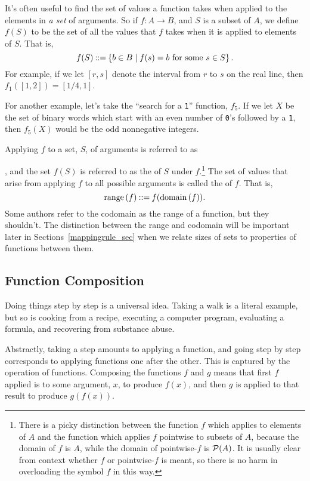 It's often useful to find the set of values a function takes when applied
to the elements in \emph{a set} of arguments.  So if $f:A \to B$, and $S$
is a subset of $A$, we define $f(S)$ to be the set of all the values that
$f$ takes when it is applied to elements of $S$.  That is,
\[
f(S) \mathbin{::=} \left\{b \in B \mid f(s) = b \text{ for some } s
  \in S\right\}.
\]
For example, if we let $[r,s]$ denote the interval from $r$ to $s$ on the
real line, then $f_1([1,2]) = [1/4,1]$.

For another example, let's take the ``search for a \texttt{1}''
function, $f_5$.  If we let $X$ be the set of binary words which
start with an even number of \texttt{0}'s followed by a
\texttt{1}, then $f_5(X)$ would be the odd nonnegative integers.

Applying $f$ to a set, $S$, of arguments is referred to as
, and the
set $f(S)$ is referred to as the  of $S$ under
$f$.\footnote{There is a picky distinction between the function $f$ which
  applies to elements of $A$ and the function which applies $f$ pointwise
  to subsets of $A$, because the domain of $f$ is $A$, while the domain of
  pointwise-$f$ is $\mathcal{P}(A)$.  It is usually clear from context whether
  $f$ or pointwise-$f$ is meant, so there is no harm in overloading the
  symbol $f$ in this way.}  The set of values that arise from applying $f$
to all possible arguments is called the  of $f$.  That is,
\[
\mathop{\textup{range}}\nolimits\left(f\right) \mathbin{::=} f(\mathop{\textup{domain}}\nolimits\left(f\right)).
\]
Some authors refer to the codomain as the range of a function, but
they shouldn't.  The distinction between the range and codomain will
be important later in Sections~\ref{mappingrule_sec} when we
relate sizes of sets to properties of functions between them.

\subsection{Function Composition}\label{func_compose_subsec}

Doing things step by step is a universal idea.  Taking a walk is a literal
example, but so is cooking from a recipe, executing a computer program,
evaluating a formula, and recovering from substance abuse.

Abstractly, taking a step amounts to applying a function, and going step
by step corresponds to applying functions one after the other.  This is
captured by the operation of  functions.  Composing the
functions $f$ and $g$ means that first $f$ applied is to some argument,
$x$, to produce $f(x)$, and then $g$ is applied to that result to produce
$g(f(x))$.

